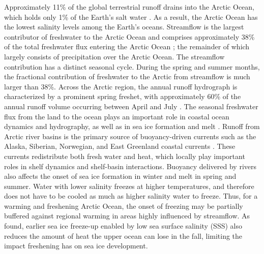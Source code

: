 \documentclass[jgrga, draft]{agutex}
\begin{document}
\begin{article}
Approximately 11\% of the global terrestrial runoff drains into the Arctic Ocean, which holds only 1\% of the Earth's salt water \citep{Lewis_2000,Lammers_2001}. %
As a result, the Arctic Ocean has the lowest salinity levels among the Earth's oceans. %
Streamflow is the largest contributor of freshwater to the Arctic Ocean and comprises approximately 38\% of the total freshwater flux entering the Arctic Ocean \citep{Serreze_2006}; the remainder of which largely consists of precipitation over the Arctic Ocean. %
The streamflow contribution has a distinct seasonal cycle.
During the spring and summer months, the fractional contribution of freshwater to the Arctic from streamflow is much larger than 38\%.
Across the Arctic region, the annual runoff hydrograph is characterized by a prominent spring freshet, with approximately 60\% of the annual runoff volume occurring between April and July \citep{Lammers_2001}.
The seasonal freshwater flux from the land to the ocean plays an important role in coastal ocean dynamics and hydrography, as well as in sea ice formation and melt \citep{Rabe_2011,Fichot_2013}.
Runoff from Arctic river basins is the primary source of buoyancy-driven currents such as the Alaska, Siberian, Norwegian, and East Greenland coastal currents \citep[e.g.][]{Morison_2000,Boyd_2002,McGeehan_2012}.
These currents redistribute both fresh water and heat, which locally play important roles in shelf dynamics and shelf-basin interactions.
Buoyancy delivered by rivers also affects the onset of sea ice formation in winter and melt in spring and summer.
Water with lower salinity freezes at higher temperatures, and therefore does not have to be cooled as much as higher salinity water to freeze.
Thus, for a warming and freshening Arctic Ocean, the onset of freezing may be partially buffered against regional warming in areas highly influenced by streamflow.
As \citet{Morison_2012} found, earlier sea ice freeze-up enabled by low sea surface salinity (SSS) also reduces the amount of heat the upper ocean can lose in the fall, limiting the impact freshening has on sea ice development.  %


\end{article}
\end{document}

